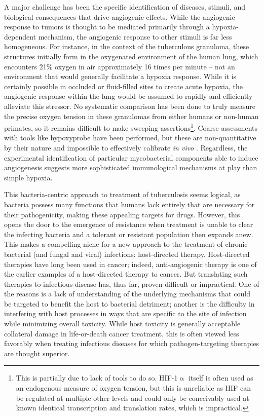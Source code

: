 A major challenge has been the specific identification of diseases, stimuli, and biological consequences that drive angiogenic effects. While the angiogenic response to tumors is thought to be mediated primarily through a hypoxia\hyp{}dependent mechanism, the angiogenic response to other stimuli is far less homogeneous. For instance, in the context of the tuberculous granuloma, these structures initially form in the oxygenated environment of the human lung, which encounters 21\% oxygen in air approximately 16 times per minute -- not an environment that would generally facilitate a hypoxia response. While it is certainly possible in occluded or fluid\hyp{}filled sites to create acute hypoxia, the angiogenic response within the lung would be assumed to rapidly and efficiently alleviate this stressor. No systematic comparison has been done to truly measure the precise oxygen tension in these granulomas from either humans or non\hyp{}human primates, so it remains difficult to make sweeping assertions\footnote{This is partially due to lack of tools to do so. HIF-1$\upalpha$ itself is often used as an endogenous measure of oxygen tension, but this is unreliable as HIF can be regulated at multiple other levels and could only be conceivably used at known identical transcription and translation rates, which is impractical.}. Coarse assessments with tools like hypoxyprobe have been performed, but these are non\hyp{}quantitative by their nature and impossible to effectively calibrate \textit{in vivo} \citep{Cousins2016}. Regardless, the experimental identification of particular mycobacterial components able to induce angiogenesis suggests more sophisticated immunological mechanisms at play than simple hypoxia.

This bacteria\hyp{}centric approach to treatment of tuberculosis seems logical, as bacteria possess many functions that humans lack entirely that are necessary for their pathogenicity, making these appealing targets for drugs. However, this opens the door to the emergence of resistance when treatment is unable to clear the infecting bacteria and a tolerant or resistant population then expands anew. This makes a compelling niche for a new approach to the treatment of chronic bacterial (and fungal and viral) infections: host\hyp{}directed therapy. Host\hyp{}directed therapies have long been used in cancer; indeed, anti\hyp{}angiogenic therapy is one of the earlier examples of a host\hyp{}directed therapy to cancer. But translating such therapies to infectious disease has, thus far, proven difficult or impractical. One of the reasons is a lack of understanding of the underlying mechanisms that could be targeted to benefit the host to bacterial detriment; another is the difficulty in interfering with host processes in ways that are specific to the site of infection while minimizing overall toxicity. While host toxicity is generally acceptable collateral damage in life-or-death cancer treatment, this is often viewed less favorably when treating infectious diseases for which pathogen\hyp{}targeting therapies are thought superior. 

